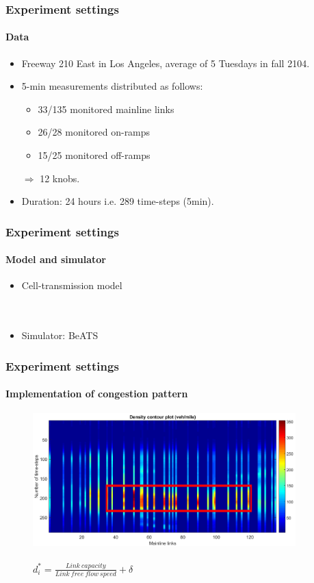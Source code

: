 \documentclass[fleqn]{beamer}
\begin{document}
\begin{frame}
	\frametitle{Experiment settings}
	\framesubtitle{Data}
	\begin{itemize}
		\item Freeway 210 East in Los Angeles, average of 5 Tuesdays in fall 2104.
		\item  5-min measurements distributed as follows:
		\begin{itemize}
			\item 33/135 monitored mainline links
			\item 26/28 monitored on-ramps
			\item 15/25 monitored off-ramps
		\end{itemize}
		$\Rightarrow$ 12 knobs.
		\item Duration: 24 hours i.e.  289 time-steps (5min).
	\end{itemize}
\end{frame}

\begin{frame}
	\frametitle{Experiment settings}
	\framesubtitle{Model and simulator}
	\begin{itemize}
	\item Cell-transmission model\\
	~\\
	~\\
	\item Simulator: BeATS
	\end{itemize}
\end{frame}


\begin{frame}
	\frametitle{Experiment settings}
	\framesubtitle{Implementation of congestion pattern}
	\begin{figure}
		\centering
		\includegraphics[width=4in]{figures/PeMS_contour.png}\\
		~\\
		$d_{i}^{*}=\frac{Link\ capacity}{Link\ free\ flow\ speed}+\delta$
	\end{figure}
\end{frame}
\end{document}
